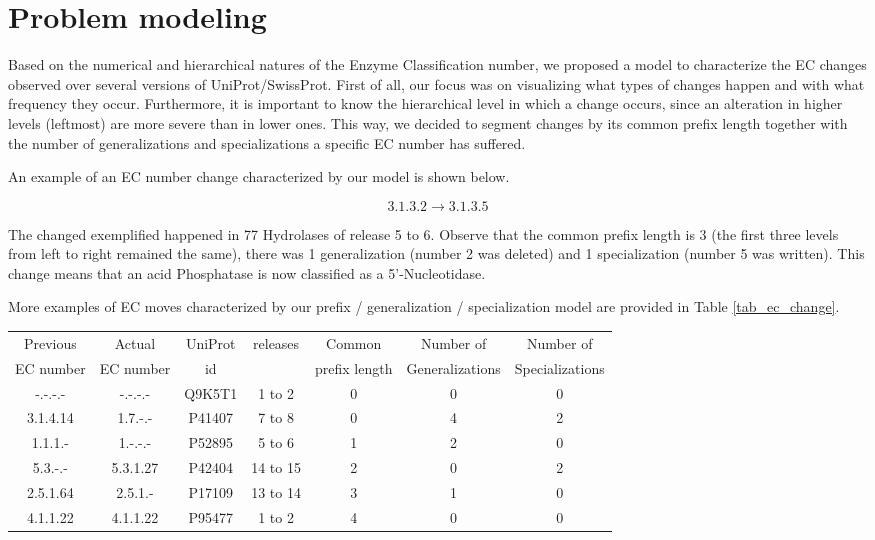 \section{Problem modeling}
\label{sec:modelling}

Based on the numerical and hierarchical natures of the Enzyme Classification number, we proposed a model to characterize the EC changes observed over several versions of UniProt/SwissProt. First of all, our focus was on visualizing what types of changes happen and with what frequency they occur. Furthermore, it is important to know the hierarchical level in which a change occurs, since an alteration in higher levels (leftmost) are more severe than in lower ones. This way, we decided to segment changes by its common prefix length together with the number of generalizations and specializations a specific EC number has suffered.

An example of an EC number change characterized by our model is shown below.

$$3.1.3.2 \rightarrow 3.1.3.5$$

The changed exemplified happened in 77 Hydrolases of release 5 to 6. Observe that the common prefix length is 3 (the first three levels from left to right remained the same), there was 1 generalization (number 2 was deleted) and 1 specialization (number 5 was written). This change means that an acid Phosphatase is now classified as a 5'-Nucleotidase.

More examples of EC moves characterized by our prefix / generalization / specialization model are provided in Table \ref{tab_ec_change}.

\begin{table*}[h]
  \caption{Example of EC numbers across consecutive database releases and our prefix / generalization / specialization model}
  \label{tab_ec_change}
  \scriptsize
  \begin{center}
    \begin{tabular}{ccccccc}
Previous & Actual & UniProt & releases & Common & Number of  & Number of \\
EC number & EC number & id & & prefix length  &  Generalizations & Specializations \\

    \hline
      -.-.-.- & -.-.-.- & Q9K5T1 & 1 to 2 & 0 & 0 & 0\\
      3.1.4.14 & 1.7.-.- & P41407 & 7 to 8 & 0 & 4 & 2 \\
      1.1.1.- & 1.-.-.- & P52895 & 5 to 6 & 1 & 2 & 0 \\
      5.3.-.- & 5.3.1.27 & P42404 & 14 to 15 & 2 & 0 & 2 \\
      2.5.1.64 & 2.5.1.- & P17109 & 13 to 14 & 3 & 1 & 0 \\
      4.1.1.22 & 4.1.1.22 & P95477 & 1 to 2 & 4 & 0 & 0 \\
    \end{tabular}
  \end{center}
\end{table*}

